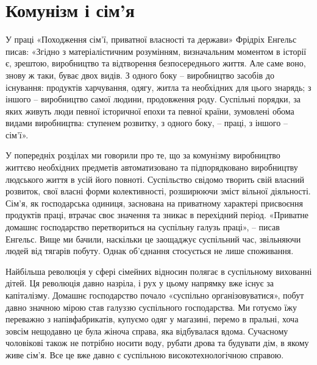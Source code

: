 \documentclass[12pt,a4paper,openany]{book}
\begin{document}
\section{Комунізм і сім’я}
\label{sec:09_kommunizm_semya}

У праці «Походження сім’ї, приватної власності та держави» Фрідріх Енгельс писав: «Згідно з матеріалістичним розумінням, визначальним моментом в історії є, зрештою, виробництво та відтворення безпосереднього життя. Але саме воно, знову ж таки, буває двох видів. З одного боку – виробництво засобів до існування: продуктів харчування, одягу, житла та необхідних для цього знарядь; з іншого – виробництво самої людини, продовження роду. Суспільні порядки, за яких живуть люди певної історичної епохи та певної країни, зумовлені обома видами виробництва: ступенем розвитку, з одного боку, – праці, з іншого – сім’ї».

У попередніх розділах ми говорили про те, що за комунізму виробництво життєво необхідних предметів автоматизовано та підпорядковано виробництву людського життя в усій його повноті. Суспільство свідомо творить свій власний розвиток, свої власні форми колективності, розширюючи зміст вільної діяльності. Сім’я, як господарська одиниця, заснована на приватному характері присвоєння продуктів праці, втрачає своє значення та зникає в перехідний період. «Приватне домашнє господарство перетвориться на суспільну галузь праці», – писав Енгельс. Вище ми бачили, наскільки це заощаджує суспільний час, звільняючи людей від тягарів побуту. Однак об’єднання стосується не лише споживання.

Найбільша революція у сфері сімейних відносин полягає в суспільному вихованні дітей. Ця революція давно назріла, і рух у цьому напрямку вже існує за капіталізму. Домашнє господарство почало «суспільно організовуватися», побут давно значною мірою став галуззю суспільного господарства. Ми готуємо їжу переважно з напівфабрикатів, купуємо одяг у магазині, перемо в пральні, хоча зовсім нещодавно це була жіноча справа, яка відбувалася вдома. Сучасному чоловікові також не потрібно носити воду, рубати дрова та будувати дім, в якому живе сім’я. Все це вже давно є суспільною високотехнологічною справою.
\end{document}
